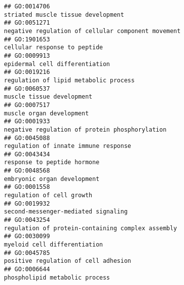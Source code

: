 \documentclass[
]{article}
\begin{document}
\begin{verbatim}
## GO:0014706                                                                                                               striated muscle tissue development
## GO:0051271                                                                                               negative regulation of cellular component movement
## GO:1901653                                                                                                                     cellular response to peptide
## GO:0009913                                                                                                                   epidermal cell differentiation
## GO:0019216                                                                                                            regulation of lipid metabolic process
## GO:0060537                                                                                                                        muscle tissue development
## GO:0007517                                                                                                                         muscle organ development
## GO:0001933                                                                                                   negative regulation of protein phosphorylation
## GO:0045088                                                                                                             regulation of innate immune response
## GO:0043434                                                                                                                      response to peptide hormone
## GO:0048568                                                                                                                      embryonic organ development
## GO:0001558                                                                                                                        regulation of cell growth
## GO:0019932                                                                                                              second-messenger-mediated signaling
## GO:0043254                                                                                                regulation of protein-containing complex assembly
## GO:0030099                                                                                                                     myeloid cell differentiation
## GO:0045785                                                                                                             positive regulation of cell adhesion
## GO:0006644                                                                                                                   phospholipid metabolic process

\end{verbatim}
\end{document}
